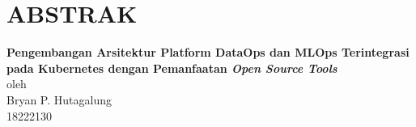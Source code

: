 \chapter*{ABSTRAK}

\begin{center}

    \textbf{Pengembangan Arsitektur Platform DataOps dan MLOps Terintegrasi pada Kubernetes dengan Pemanfaatan \textit{Open Source Tools}} \\
    \vspace{0.3cm}
    oleh \\
    \vspace{0.3cm}
    Bryan P. Hutagalung\\
    18222130\\
\end{center}


